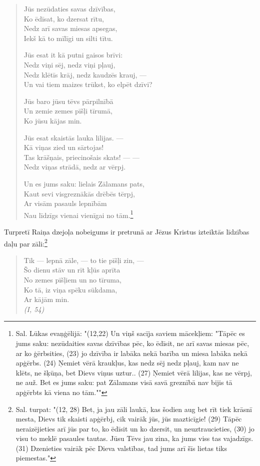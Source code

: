 \documentclass[11pt]{article}
\begin{document}
\begin{quote}
Jūs nezūdaties savas dzīvības,\\
Ko ēdīsat, ko dzersat rītu,\\
Nedz arī savas miesas apsegas,\\
Iekš kā to mīlīgi un silti tītu.

Jūs esat it kā putni gaisos brīvi:\\
Nedz viņi sēj, nedz viņi pļauj,\\
Nedz klētīs krāj, nedz kaudzēs krauj, ---\\
Un vai tiem maizes trūkst, ko elpēt dzīvi?

Jūs baro jūsu tēvs pārpilnībā\\
Un zemie zemes pīšļi tīrumā,\\
Ko jūsu kājas min.

Jūs esat skaistās lauka lilijas. ---\\
Kā viņas zied un sārtojas!\\
Tas krāšņais, priecinošais skats! --- ---\\
Nedz viņas strādā, nedz ar vērpj.

Un es jums saku: lielais Zālamans pats,\\
Kaut sevi visgreznākās drēbēs tērpj,\\
Ar visām pasauls lepnībām\\
Nau līdzīgs vienai vienīgai no tām.\footnote{Sal.
Lūkas evaņģēlijā: "(12,22) Un viņš sacīja saviem
mācekļiem: "Tāpēc es jums saku: nezūdaities savas
dzīvības pēc, ko ēdīsit, ne arī savas miesas pēc,
ar ko ģērbsities, (23) jo dzīvība ir labāka nekā
barība un miesa labāka nekā apģērbs. (24) Ņemiet
vērā kraukļus, kas nedz sēj nedz pļauj, kam nav ne klēts, ne
šķūņa, bet Dievs viņus uztur.. (27) Ņemiet vērā
lilijas, kas ne vērpj, ne auž. Bet es jums saku: pat
Zālamans visā savā greznībā nav bijis tā apģērbts
kā viena no tām.""}
\end{quote}

Turpretī Raiņa dzejoļa nobeigums ir pretrunā ar
Jēzus Kristus izteiktās līdzības daļu par zāli:\footnote{Sal.
turpat: "(12, 28) Bet, ja jau zāli laukā, kas šodien
aug bet rīt tiek krāsnī mesta, Dievs tik skaisti
apģērbj, cik vairāk jūs, jūs mazticīgie! (29) Tāpēc
neraizējieties arī jūs par to, ko ēdīsit un ko dzersit, un
neuztraucieties, (30) jo visu to meklē pasaules tautas.
Jūsu Tēvs jau zina, ka jums viss tas vajadzīgs.
(31) Dzenieties vairāk pēc Dieva valstības, tad jums arī
šīs lietas tiks piemestas."}


\begin{quote}
Tik --- lepnā zāle, --- to tie pīšļi zin, ---\\
Šo dienu stāv un rīt kļūs aprīta\\
No zemes pīšļiem un no tīruma,\\
Ko tā, iz viņa spēku sūkdama,\\
Ar kājām min.\\
{\em (I, 54)}
\end{quote}
\end{document}
